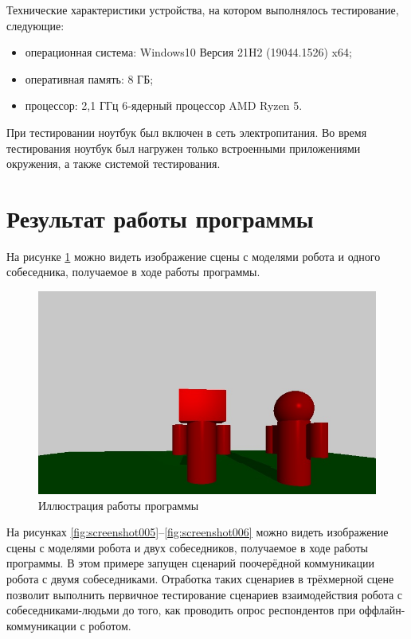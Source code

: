 Технические характеристики устройства, на котором выполнялось тестирование, следующие:
\begin{itemize}
	\item операционная система: Windows10 Версия 21H2 (19044.1526) x64;
	\item оперативная память: 8 ГБ;
	\item процессор: 2,1 ГГц 6‑ядерный процессор AMD Ryzen 5.
\end{itemize}

При тестировании ноутбук был включен в сеть электропитания. Во время тестирования ноутбук был нагружен только встроенными приложениями окружения, а также системой тестирования.

\section{Результат работы программы}

На рисунке \ref{fig:screenshot004} можно видеть изображение сцены с моделями робота и одного собеседника, получаемое в ходе работы программы.

\begin{figure}[h]
	\centering
	\includegraphics[width=1.0\linewidth]{images/screenshot004}
	\caption{Иллюстрация работы программы}
	\label{fig:screenshot004}
\end{figure}

На рисунках \ref{fig:screenshot005}--\ref{fig:screenshot006} можно видеть изображение сцены с моделями робота и двух собеседников, получаемое в ходе работы программы. В этом примере запущен сценарий поочерёдной коммуникации робота с двумя собеседниками. Отработка таких сценариев в трёхмерной сцене позволит выполнить первичное тестирование сценариев взаимодействия робота с собеседниками-людьми до того, как проводить опрос респондентов при оффлайн-коммуникации с роботом.

